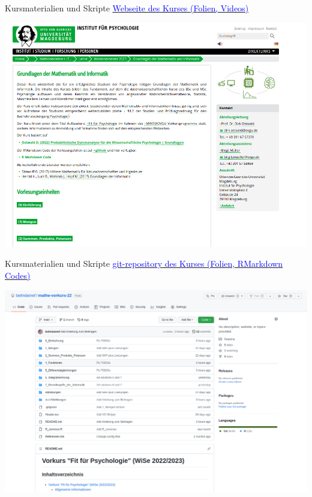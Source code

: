 \documentclass[
  8pt,
  ignorenonframetext,
  t]{beamer}
\begin{document}
\begin{frame}{Kursmaterialien und Skripte}
\protect\hypertarget{kursmaterialien-und-skripte}{}
\href{https://www.ipsy.ovgu.de/Institut/Abteilungen+des+Institutes/Methodenlehre+I+_+Experimentelle+und+Neurowissenschaftliche+Psychologie/Lehre/Wintersemester+2023/Grundlagen+der+Mathematik+und+Informatik.html}{\textcolor{blue}{Webseite des Kurses (Folien, Videos)}}

\vspace{5mm}

\begin{center}\includegraphics[width=0.75\linewidth]{../Abbildungen/glmi_0_kursseite} \end{center}
\end{frame}

\begin{frame}{Kursmaterialien und Skripte}
\protect\hypertarget{kursmaterialien-und-skripte-1}{}
\href{https://github.com/belindamef/mathe-vorkurs-22}{\textcolor{blue}{git-repository des Kurses (Folien, RMarkdown Codes)}}

\vspace{5mm}

\begin{center}\includegraphics[width=0.75\linewidth]{../Abbildungen/glmi_0_git_repo} \end{center}
\end{frame}
\end{document}
